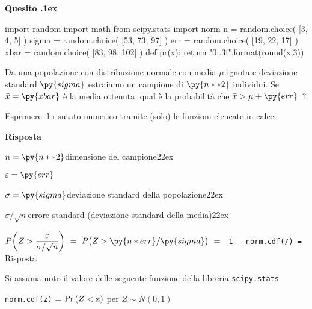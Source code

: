 \documentclass[11pt,twoside,a4paper]{article}
\def\Pr{{\rm Pr\,}}
\newcounter{quesito}
\newenvironment{question}{\addtocounter{quesito}{1}\bigskip\bigskip\par\textbf{Quesito \thequesito.\kern1ex}}{\vspace{\parskip}}
\newenvironment{answer}{\par\textbf{Risposta\quad}}{\vspace{\parskip}}
\begin{document}
\begin{question} %
\begin{pycode}
import random
import math
from scipy.stats import norm
n = random.choice( [3, 4, 5] )
sigma = random.choice( [53, 73, 97] )
err = random.choice( [19, 22, 17] )
xbar = random.choice( [83, 98, 102] )
def pr(x):
    return "{0:.3f}".format(round(x,3))

\end{pycode}
Da una popolazione con distribuzione normale con media $\mu$ ignota e deviazione standard $\py{sigma}$ estraiamo un campione di $\py{n**2}$ individui. Se $\bar x= \py{xbar}$ è la media ottenuta, qual è la probabilità che $\bar x>\mu+ \py{err}$~? 
    
Esprimere il risutato numerico tramite (solo) le funzioni elencate in calce.

\begin{answer}
  
  $n = \py{n**2}$\hfill dimensione del campione\kern22ex
  
  $\varepsilon = \py{err}$ 
  
  $\sigma = \py{sigma}$\hfill deviazione standard della popolazione\kern22ex
  
  $\sigma/\sqrt{n}$\hfill errore standard (deviazione standard della media)\kern22ex
  
  $P\bigg(Z>\dfrac {\varepsilon}{\sigma/\sqrt{n}}\bigg)\ =\ P\big(Z>\py{n * err}/\py{sigma}\big)\ =\ ${\color{blue}\tt\ 1 - norm.cdf(/)}{\tt\ =  }{\color{blue}\hfill Risposta}

\end{answer}
\end{question}


\vfill
\hrulefill

Si assuma noto il valore delle seguente funzione della libreria {\tt scipy.stats\/}

{\tt norm.cdf(z)} = $\Pr(Z<{\tt z})$ per $Z\sim N(0,1)$ 
\end{document}

